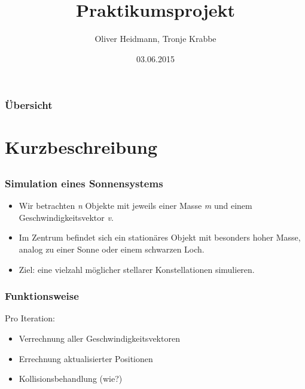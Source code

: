 \documentclass{beamer}
\title[PAPO 2015]{Praktikumsprojekt}
\author{Oliver Heidmann, Tronje Krabbe}
\institute[UHH]
{
Uni Hamburg \\
Praktikum Parallele Programmierung\\
}
\date{03.06.2015}
\begin{document}
\begin{frame}
\titlepage
\end{frame}

\begin{frame}
\frametitle{Übersicht}
\tableofcontents
\end{frame}



\section{Kurzbeschreibung}

\subsection{}


\begin{frame}
    \frametitle{Simulation eines Sonnensystems}
    \begin{itemize}
        \item Wir betrachten \textit{n} Objekte
            mit jeweils einer Masse \textit{m}
            und einem Geschwindigkeitsvektor \textit{v}.
        \item Im Zentrum befindet sich ein stationäres Objekt
            mit besonders hoher Masse, analog zu einer Sonne
            oder einem schwarzen Loch.
        \item Ziel: eine vielzahl möglicher stellarer
            Konstellationen simulieren.
    \end{itemize}
\end{frame}


\begin{frame}
    \frametitle{Funktionsweise}
    Pro Iteration:
    \begin{itemize}
        \item Verrechnung aller Geschwindigkeitsvektoren
        \item Errechnung aktualisierter Positionen
        \item Kollisionsbehandlung (wie?)
    \end{itemize}
\end{frame}
\end{document}
